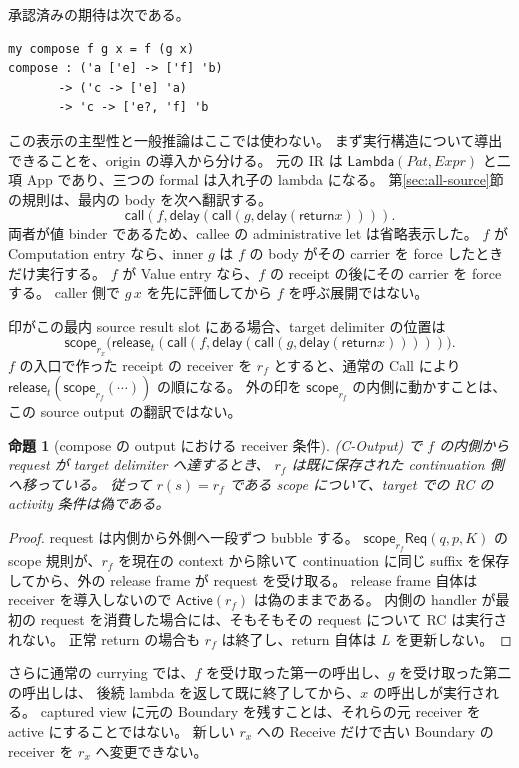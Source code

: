 \documentclass[11pt,a4paper]{article}
\newtheorem{proposition}[definition]{命題}
\newcommand{\Ret}{\mathsf{return}}
\newcommand{\Call}{\mathsf{call}}
\newcommand{\Delay}{\mathsf{delay}}
\newcommand{\Scope}{\mathsf{scope}}
\newcommand{\Req}{\mathsf{Req}}
\newcommand{\Act}{\mathsf{Active}}
\begin{document}
承認済みの期待は次である。
\begin{Verbatim}[fontsize=\small]
my compose f g x = f (g x)
compose : ('a ['e] -> ['f] 'b)
       -> ('c -> ['e] 'a)
       -> 'c -> ['e?, 'f] 'b
\end{Verbatim}
この表示の主型性と一般推論はここでは使わない。
まず実行構造について導出できることを、origin の導入から分ける。
元の IR は \(\mathsf{Lambda}(Pat,Expr)\) と二項 App であり、三つの formal は入れ子の lambda になる。
第\ref{sec:all-source}節の規則は、最内の body を次へ翻訳する。
\[
 \Call(f,\Delay(\Call(g,\Delay(\Ret x)))).
 \tag{C-Body}
\]
両者が値 binder であるため、callee の administrative let は省略表示した。
\(f\) が Computation entry なら、inner \(g\) は \(f\) の body がその carrier を force したときだけ実行する。
\(f\) が Value entry なら、\(f\) の receipt の後にその carrier を force する。
caller 側で \(g\,x\) を先に評価してから \(f\) を呼ぶ展開ではない。

印がこの最内 source result slot にある場合、target delimiter の位置は
\[
 \Scope_{r_x}\bigl(\mathsf{release}_{t}
     (\Call(f,\Delay(\Call(g,\Delay(\Ret x)))) )\bigr).
 \tag{C-Output}
\]
\(f\) の入口で作った receipt の receiver を \(r_f\) とすると、通常の Call により
\(\mathsf{release}_t(\Scope_{r_f}(\cdots))\) の順になる。
外の印を \(\Scope_{r_f}\) の内側に動かすことは、この source output の翻訳ではない。

\begin{proposition}[compose の output における receiver 条件]
\label{prop:compose-lifetime}
(C-Output) で \(f\) の内側から request が target delimiter へ達するとき、
\(r_f\) は既に保存された continuation 側へ移っている。
従って \(r(s)=r_f\) である scope について、target での RC の activity 条件は偽である。
\end{proposition}
\begin{proof}
request は内側から外側へ一段ずつ bubble する。
\(\Scope_{r_f}\Req(q,p,K)\) の scope 規則が、\(r_f\) を現在の context から除いて
continuation に同じ suffix を保存してから、外の release frame が request を受け取る。
release frame 自体は receiver を導入しないので \(\Act(r_f)\) は偽のままである。
内側の handler が最初の request を消費した場合には、そもそもその request について RC は実行されない。
正常 return の場合も \(r_f\) は終了し、return 自体は \(L\) を更新しない。
\end{proof}

さらに通常の currying では、\(f\) を受け取った第一の呼出し、\(g\) を受け取った第二の呼出しは、
後続 lambda を返して既に終了してから、\(x\) の呼出しが実行される。
captured view に元の Boundary を残すことは、それらの元 receiver を active にすることではない。
新しい \(r_x\) への Receive だけで古い Boundary の receiver を \(r_x\) へ変更できない。
\end{document}
